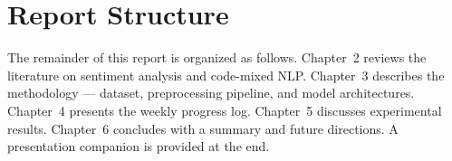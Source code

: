\section{Report Structure}

The remainder of this report is organized as follows. Chapter~2 reviews the literature on sentiment analysis and code-mixed NLP. Chapter~3 describes the methodology — dataset, preprocessing pipeline, and model architectures. Chapter~4 presents the weekly progress log. Chapter~5 discusses experimental results. Chapter~6 concludes with a summary and future directions. A presentation companion is provided at the end.


